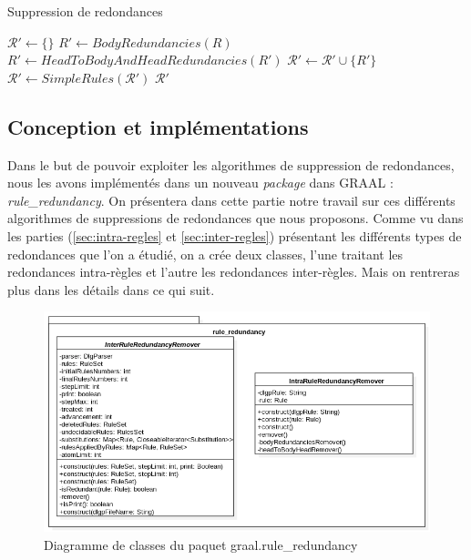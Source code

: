 \begin{algorithm}[H]\label{algo:redondances}
\caption{Suppression de redondances}
\SetAlgoLined
\DontPrintSemicolon
\SetAlgoLined
\DontPrintSemicolon
{}
    $\mathcal{R}' \gets \{\}$\; 
    {
        $R' \gets BodyRedundancies(R)$ \;
        $R' \gets HeadToBodyAndHeadRedundancies(R')$\;
        $\mathcal{R'} \gets \mathcal{R'} \cup \{R'\}$\;
    }
    $\mathcal{R'} \gets SimpleRules(\mathcal{R'})$\;
    \Return $\mathcal{R}'$
\end{algorithm}






\subsection{Conception et implémentations}\label{sec:conception-RAMIX}
    \par Dans le but de pouvoir exploiter les algorithmes de suppression de redondances, nous les avons implémentés dans un nouveau \textit{package} dans GRAAL : \textit{rule\_redundancy}. On présentera dans cette partie notre travail sur ces différents algorithmes de suppressions de redondances que nous proposons. Comme vu dans les parties (\ref{sec:intra-regles} et \ref{sec:inter-regles}) présentant les différents types de redondances que l'on a étudié, on a crée deux classes, l'une traitant les redondances intra-règles et l'autre les redondances inter-règles. Mais on rentreras plus dans les détails dans ce qui suit.

        \begin{figure}[H]
        \centering
        \includegraphics[width=\textwidth]{pictures/RedondanceDiagrammeClasse.png}
        \caption{Diagramme de classes du paquet graal.rule_redundancy}
        \label{fig:dclasse}
        \end{figure}
        

